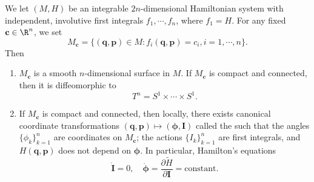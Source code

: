 \documentclass[a4paper]{article}
\begin{document}
\begin{thm}
  We let $(M, H)$ be an integrable $2n$-dimensional Hamiltonian system with independent, involutive first integrals $f_1, \cdots, f_n$, where $f_1 = H$. For any fixed $\mathbf{c} \in \R^n$, we set
  \[
    M_\mathbf{c} = \{(\mathbf{q}, \mathbf{p}) \in M: f_i(\mathbf{q}, \mathbf{p}) = c_i, i =1 , \cdots, n\}.
  \]
  Then
  \begin{enumerate}
    \item $M_\mathbf{c}$ is a smooth $n$-dimensional surface in $M$. If $M_\mathbf{c}$ is compact and connected, then it is diffeomorphic to
      \[
        T^n = S^1 \times \cdots \times S^1.
      \]
    \item If $M_\mathbf{c}$ is compact and connected, then locally, there exists canonical coordinate transformations $(\mathbf{q}, \mathbf{p}) \mapsto (\boldsymbol\phi, \mathbf{I})$ called the  such that the angles $\{\phi_k\}_{k = 1}^n$ are coordinates on $M_\mathbf{c}$; the actions $\{I_k\}_{k = 1}^n$ are first integrals, and $H(\mathbf{q}, \mathbf{p})$ does not depend on $\boldsymbol\phi$. In particular, Hamilton's equations
      \[
        \dot{\mathbf{I}} = 0,\quad \dot{\boldsymbol\phi} = \frac{\partial \tilde{H}}{\partial \mathbf{I}} = \text{constant}.
      \]
  \end{enumerate}
\end{thm}
\end{document}
